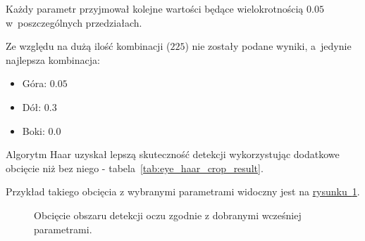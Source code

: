 Każdy parametr przyjmował kolejne wartości będące wielokrotnością $0.05$ w~poszczególnych przedziałach.

\par

Ze względu na dużą ilość kombinacji ($225$) nie zostały podane wyniki, a~jedynie najlepsza kombinacja:

\begin{itemize}
    \item Góra: $0.05$
    \item Dół: $0.3$
    \item Boki: $0.0$
\end{itemize}

Algorytm Haar uzyskał lepszą skuteczność detekcji wykorzystując dodatkowe obcięcie niż bez niego - tabela~\ref{tab:eye_haar_crop_result}.



Przykład takiego obcięcia z wybranymi parametrami widoczny jest na \hyperref[{fig:eye_crop}]{rysunku~\ref{fig:eye_crop}}.

\begin{figure}[!h]
    \begin{center}
        \hspace{8mm}
    \end{center}
    \caption{Obcięcie obszaru detekcji oczu zgodnie z dobranymi wcześniej parametrami.}
    \label{fig:eye_crop}
\end{figure}

